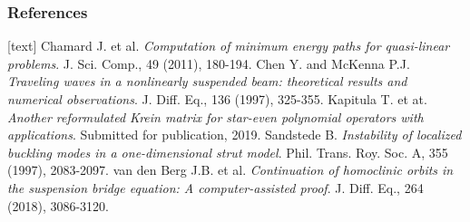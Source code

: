 \documentclass[16pt]{beamer}
\begin{document}
\begin{frame}
\frametitle{References}
      \fontsize{12}{7.2}\selectfont
      \begin{thebibliography}{9}
      [text]
       Chamard J. et al. \emph{Computation of minimum energy paths for quasi-linear problems}. J. Sci. Comp., 49 (2011), 180-194.
       Chen Y. and McKenna P.J. \emph{Traveling waves in a nonlinearly suspended beam: theoretical results and numerical observations}. J. Diff. Eq., 136 (1997), 325-355. Kapitula T. et at. \emph{Another reformulated Krein matrix for star-even polynomial operators with applications}. Submitted for publication, 2019.
       Sandstede B. \emph{Instability of localized buckling modes in a one-dimensional strut model}. Phil. Trans. Roy. Soc. A, 355 (1997), 2083-2097.
       van den Berg J.B. et al. \emph{Continuation of homoclinic orbits in the suspension bridge equation: A computer-assisted proof}. J. Diff. Eq., 264 (2018), 3086-3120.
      \end{thebibliography}
\end{frame}
\end{document}
